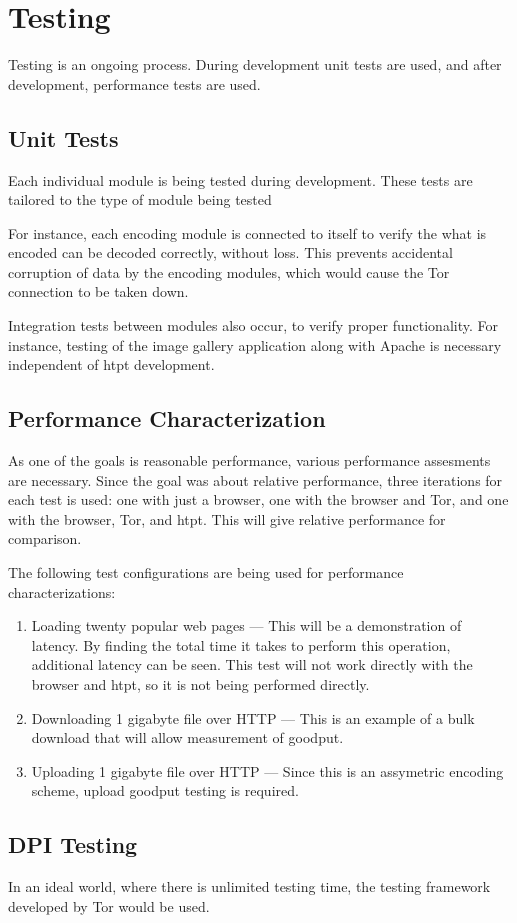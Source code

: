 \section{Testing}

Testing is an ongoing process. During development unit tests are used, and after development, performance tests are used. 

\subsection{Unit Tests}
Each individual module is being tested during development. These tests are tailored to the type of module being tested

For instance, each encoding module is connected to itself to verify the what is encoded can be decoded correctly, without loss. This prevents accidental corruption of data by the encoding modules, which would cause the Tor connection to be taken down.

Integration tests between modules also occur, to verify proper functionality. For instance, testing of the image gallery application along with Apache is necessary independent of htpt development. 

\subsection{Performance Characterization}
As one of the goals is reasonable performance, various performance assesments are necessary. Since the goal was about relative performance, three iterations for each test is used: one with just a browser, one with the browser and Tor, and one with the browser, Tor, and htpt. This will give relative performance for comparison. 

The following test configurations are being used for performance characterizations:  
\begin{enumerate}
  \item Loading twenty popular web pages --- This will be a demonstration of latency. By finding the total time it takes to perform this operation, additional latency can be seen. This test will not work directly with the browser and htpt, so it is not being performed directly. 
  \item Downloading 1 gigabyte file over HTTP --- This is an example of a bulk download that will allow measurement of goodput.
  \item Uploading 1 gigabyte file over HTTP --- Since this is an assymetric encoding scheme, upload goodput testing is required.
\end{enumerate}

\subsection{DPI Testing}
In an ideal world, where there is unlimited testing time, the testing framework developed by Tor \cite{Ref14} would be used. 